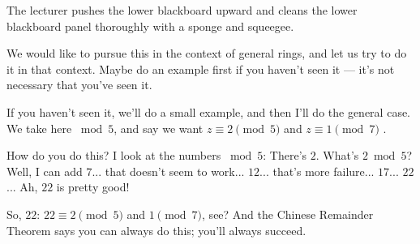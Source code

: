 \begin{note}
The lecturer pushes the lower blackboard upward and cleans the lower blackboard panel thoroughly with a sponge and squeegee.
\end{note}

\begin{speech}[01:09:07 - 01:10:32]
We would like to pursue this in the context of general rings, and let us try to do it in that context. Maybe do an example first if you haven't seen it --- it's not necessary that you've seen it.

If you haven't seen it, we'll do a small example, and then I'll do the general case. We take here $\bmod 5$, and say we want $z \equiv 2 \pmod 5$ and $z \equiv 1 \pmod 7$ .

How do you do this? I look at the numbers $\bmod 5$: There's $2$. What's $2 \bmod 5$? Well, I can add $7$... that doesn't seem to work... $12$... that's more failure... $17$... $22$... Ah, $22$ is pretty good! 

So, $22$: $22 \equiv 2 \pmod 5$ and $1 \pmod 7$, see? And the Chinese Remainder Theorem says you can always do this; you'll always succeed.
\end{speech}

\begin{content}
\end{content}

